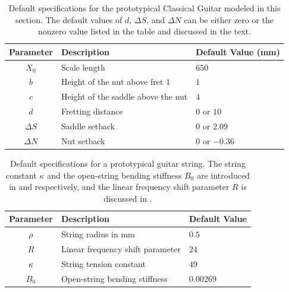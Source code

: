 \begin{table}%
  \centering
  \caption{\label{tbl:mcg_specs} Default specifications for the prototypical Classical Guitar modeled in this section. The default values of $d$, $\Delta S$, and $\Delta N$ can be either zero or the nonzero value listed in the table and discussed in the text.}
  \begin{tabular}{cll}
    \toprule
    Parameter & Description & Default Value (mm) \\
    \midrule
    $X_0$ & Scale length& $650$ \\
    $b$ & Height of the nut above fret $1$& $1$ \\
    $c$ & Height of the saddle above the nut & $4$ \\
    $d$ & Fretting distance & $0$ or $10$ \\
    $\Delta S$ & Saddle setback & $0$ or $2.09$ \\
    $\Delta N$ & Nut setback & $0$ or $-0.36$ \\
    \bottomrule
  \end{tabular}
\end{table}%

\begin{table}%
  \centering
  \caption{\label{tbl:string_specs} Default specifications for a prototypical guitar string. The string constant $\kappa$ and the open-string bending stiffness $B_0$ are introduced in  and  respectively, and the linear frequency shift parameter $R$ is discussed in .}
  \begin{tabular}{cll}
    \toprule
    Parameter & Description & Default Value \\
    \midrule
    $\rho$ & String radius in mm & $0.5$ \\
    $R$ & Linear frequency shift parameter & $24$ \\
    $\kappa$ & String tension constant & $49$ \\
    $B_0$ & Open-string bending stiffness & $0.00269$ \\
    \bottomrule
  \end{tabular}
\end{table}%

